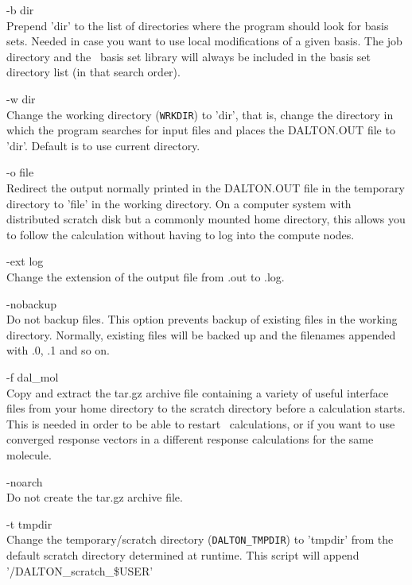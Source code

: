 \begin{list}{--}{}
\item[-b dir \hfill] \hfill \\
  Prepend 'dir' to the list of directories where the program
  should look for basis sets. Needed in case you want to use
  local modifications of a given basis. The job directory and the \dalton\ basis set library will always be included in the basis set directory list
  (in that search order).
\item[-w dir \hfill] \hfill \\
  Change the working directory (\verb|WRKDIR|) to 'dir', that is,
  change the directory in which the program searches for input files
  and places the DALTON.OUT file to 'dir'. Default is to use current
  directory.
\item[-o file \hfill] \hfill \\
  Redirect the output normally printed in the
  DALTON.OUT file in the temporary directory
  to 'file' in the working
  directory. On a computer system with distributed scratch disk but a
  commonly mounted home directory, this allows you to follow the
  calculation without having to log into the compute nodes.
\item[-ext log \hfill] \hfill \\
  Change the extension of the output file from .out to .log.
\item[-nobackup \hfill] \hfill \\
  Do not backup files. This option prevents backup of existing files in the working
  directory. Normally, existing files will be backed up and the filenames appended with
  .0, .1 and so on.
\item[-f dal\_mol \hfill] \hfill \\
  Copy and extract the tar.gz archive file containing a variety of useful
  interface files from your home directory to the scratch directory
  before a calculation starts. This is needed in order to be able to
  restart \dalton\ calculations, or if you want to use converged response
  vectors in a different response calculations for the same molecule.
\item[-noarch \hfill] \hfill \\
  Do not create the tar.gz archive file.
\item[-t tmpdir \hfill] \hfill \\
  Change the temporary/scratch directory (\verb|DALTON_TMPDIR|) to 'tmpdir' from the default scratch directory
  determined at runtime. This script will append '/DALTON\_scratch\_\$USER'

\end{list}
